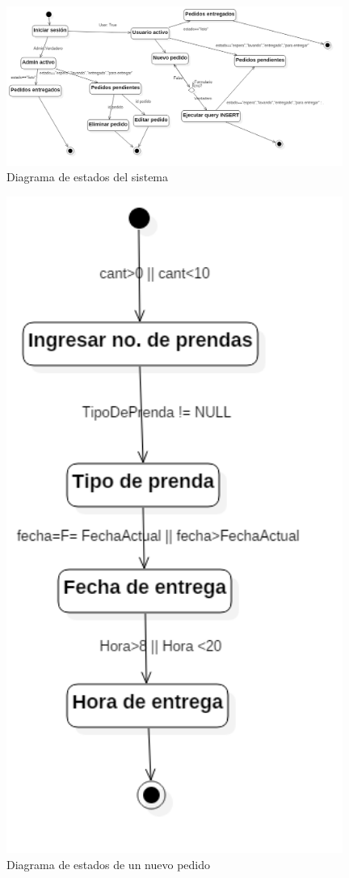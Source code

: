 \begin{figure}[htb]
\begin{center}
\includegraphics[width=11cm]{./imagenes/diagramas/Estado_lavanderia.png}
\end{center}
\caption{Diagrama de estados del sistema}
\end{figure}


\begin{figure}[htb]
\begin{center}
\includegraphics[width=11cm]{./imagenes/diagramas/Estados_lavanderia2.png}
\end{center}
\caption{Diagrama de estados de un nuevo pedido}
\end{figure}



